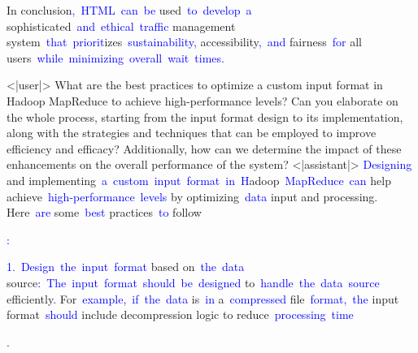 \documentclass{article}
\begin{document}
\begin{tcolorbox}[colframe=black,colback=white]
In conclusion\textcolor{blue}{,}\textcolor{blue}{~HTML}\textcolor{blue}{~can}\textcolor{blue}{~be} used\textcolor{blue}{~to}\textcolor{blue}{~develop}\textcolor{blue}{~a} sophisticated\textcolor{blue}{~and}\textcolor{blue}{~ethical}\textcolor{blue}{~traffic} management system\textcolor{blue}{~that}\textcolor{blue}{~priorit}izes\textcolor{blue}{~sustainability}\textcolor{blue}{,} accessibility\textcolor{blue}{,}\textcolor{blue}{~and} fairness\textcolor{blue}{~for} all users\textcolor{blue}{~while}\textcolor{blue}{~minimizing}\textcolor{blue}{~overall}\textcolor{blue}{~wait}\textcolor{blue}{~times}\textcolor{blue}{.}\textcolor{blue}{}
\end{tcolorbox}


\begin{tcolorbox}[colframe=black,colback=white]
<|user|>
What are the best practices to optimize a custom input format in Hadoop MapReduce to achieve high-performance levels? Can you elaborate on the whole process, starting from the input format design to its implementation, along with the strategies and techniques that can be employed to improve efficiency and efficacy? Additionally, how can we determine the impact of these enhancements on the overall performance of the system?
<|assistant|>
\textcolor{blue}{Design}\textcolor{blue}{ing} and implementing\textcolor{blue}{~a}\textcolor{blue}{~custom}\textcolor{blue}{~input}\textcolor{blue}{~format}\textcolor{blue}{~in}\textcolor{blue}{~H}adoop\textcolor{blue}{~Map}\textcolor{blue}{Reduce}\textcolor{blue}{~can} help achieve\textcolor{blue}{~high}\textcolor{blue}{-performance}\textcolor{blue}{~levels} by optimizing\textcolor{blue}{~data} input and processing\textcolor{blue}{.} Here\textcolor{blue}{~are} some\textcolor{blue}{~best} practices\textcolor{blue}{~to} follow\textcolor{blue}{:

}\textcolor{blue}{1}\textcolor{blue}{.}\textcolor{blue}{~Design}\textcolor{blue}{~the}\textcolor{blue}{~input}\textcolor{blue}{~format} based on\textcolor{blue}{~the}\textcolor{blue}{~data} source\textcolor{blue}{:}\textcolor{blue}{~The}\textcolor{blue}{~input}\textcolor{blue}{~format}\textcolor{blue}{~should}\textcolor{blue}{~be}\textcolor{blue}{~designed} to\textcolor{blue}{~handle}\textcolor{blue}{~the}\textcolor{blue}{~data}\textcolor{blue}{~source} efficiently\textcolor{blue}{.} For\textcolor{blue}{~example}\textcolor{blue}{,}\textcolor{blue}{~if}\textcolor{blue}{~the}\textcolor{blue}{~data} is\textcolor{blue}{~in} a\textcolor{blue}{~compressed} file\textcolor{blue}{~format}\textcolor{blue}{,}\textcolor{blue}{~the} input format\textcolor{blue}{~should} include decompression logic to reduce\textcolor{blue}{~processing}\textcolor{blue}{~time}\textcolor{blue}{.

}
\end{tcolorbox}
\end{document}

